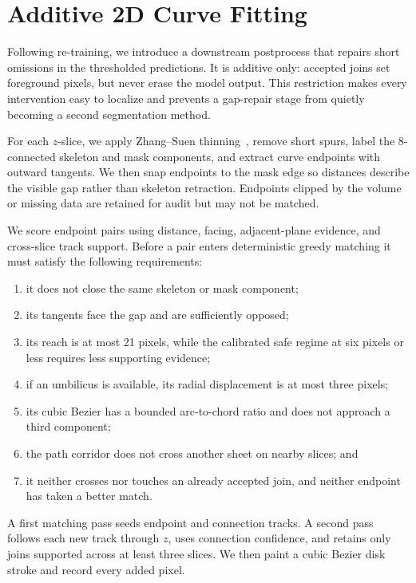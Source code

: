 \section{Additive 2D Curve Fitting}
\label{sec:fitter}
Following re-training, we introduce a downstream postprocess that repairs short omissions
in the thresholded predictions. It is additive only: accepted joins set foreground pixels, but never erase
the model output. This restriction makes every intervention easy to localize and prevents a
gap-repair stage from quietly becoming a second segmentation method.

For each $z$-slice, we apply Zhang--Suen thinning~\cite{zhang1984fast}, remove short spurs, label
the 8-connected skeleton and mask components, and extract curve endpoints with
outward tangents. We then snap endpoints to the mask edge so distances describe the visible gap rather
than skeleton retraction. Endpoints clipped by the volume or missing data are retained for audit but may
not be matched.

We score endpoint pairs using distance, facing, adjacent-plane evidence, and cross-slice track support.
Before a pair enters deterministic greedy matching it must satisfy the following requirements:

\begin{enumerate}
  \item it does not close the same skeleton or mask component;
  \item its tangents face the gap and are sufficiently opposed;
  \item its reach is at most 21 pixels, while the calibrated safe regime at six
  pixels or less requires less supporting evidence;
  \item if an umbilicus is available, its radial displacement is at most three
  pixels;
  \item its cubic Bezier has a bounded arc-to-chord ratio and does not approach
  a third component;
  \item the path corridor does not cross another sheet on nearby slices; and
  \item it neither crosses nor touches an already accepted join, and neither
  endpoint has taken a better match.
\end{enumerate}

A first matching pass seeds endpoint and connection tracks.
A second pass follows each new track through $z$, uses connection confidence, and retains
only joins supported across at least three slices.
We then paint a cubic Bezier disk stroke and record every added pixel.

